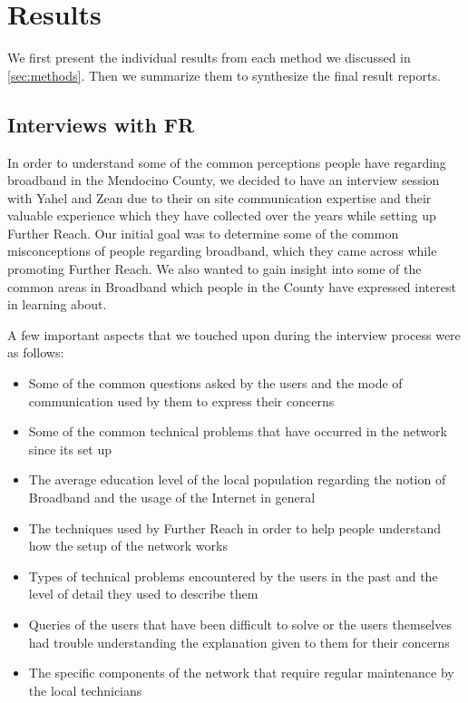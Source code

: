 \section{Results}
\label{sec:results}

We first present the individual results from each method we discussed in
\autoref{sec:methods}. Then we summarize them to synthesize the final result
reports.

\subsection{Interviews with FR}
\label{sec:interviews-with-fr}

In order to understand some of the common perceptions people have regarding broadband in the Mendocino County, we decided to have an interview session with Yahel and Zean due to their on site communication expertise and their valuable experience which they have collected over the years while setting up Further Reach. Our initial goal was to determine some of the common misconceptions of people regarding broadband, which they came across while promoting Further Reach. We also wanted to gain insight into some of the common areas in Broadband which people in the County have expressed interest in learning about.

A few important aspects that we touched upon during the interview process were as follows:
\begin{itemize}
\item Some of the common questions asked by the users and the mode of communication used by them to express their concerns
\item Some of the common technical problems that have occurred in the network since its set up
\item The average education level of the local population regarding the notion of Broadband and the usage of the Internet in general
\item The techniques used by Further Reach in order to help people understand how the setup of the network works
\item Types of technical problems encountered by the users in the past and the level of detail they used to describe them
\item Queries of the users that have been difficult to solve or the users themselves had trouble understanding the explanation given to them for their concerns
\item The specific components of the network that require regular maintenance by the local technicians
\end{itemize}

